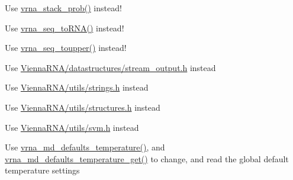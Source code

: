 \begin{DoxyRefList}
\item[\label{deprecated__deprecated000103}%
\Hypertarget{deprecated__deprecated000103}%
Global \hyperlink{group__part__func__global__deprecated_ga8f18624bcd0b47d1a266d9e5527e5362}{stack\+Prob} (double cutoff)]Use \hyperlink{group__part__func__global_ga132664bf29fdc30bb5ea715491d1ab22}{vrna\+\_\+stack\+\_\+prob()} instead! 
\item[\label{deprecated__deprecated000178}%
\Hypertarget{deprecated__deprecated000178}%
Global \hyperlink{strings_8h_ad3f18dd83f958f18b2f26ecb99305208}{str\+\_\+\+D\+N\+A2\+R\+NA} (char $\ast$sequence)]Use \hyperlink{group__string__utils_gacfed92cba77064f6c743f9118d079bfc}{vrna\+\_\+seq\+\_\+to\+R\+N\+A()} instead!  
\item[\label{deprecated__deprecated000177}%
\Hypertarget{deprecated__deprecated000177}%
Global \hyperlink{strings_8h_a17b796b806f96b70382077fb5bc519bb}{str\+\_\+uppercase} (char $\ast$sequence)]Use \hyperlink{group__string__utils_ga4f44dca03c9d708d68e64c0610bb9091}{vrna\+\_\+seq\+\_\+toupper()} instead!  
\item[\label{deprecated__deprecated000129}%
\Hypertarget{deprecated__deprecated000129}%
File \hyperlink{stream__output_8h}{stream\+\_\+output.h} ]Use \hyperlink{datastructures_2stream__output_8h}{Vienna\+R\+N\+A/datastructures/stream\+\_\+output.\+h} instead  
\item[\label{deprecated__deprecated000130}%
\Hypertarget{deprecated__deprecated000130}%
File \hyperlink{string__utils_8h}{string\+\_\+utils.h} ]Use \hyperlink{strings_8h}{Vienna\+R\+N\+A/utils/strings.\+h} instead  
\item[\label{deprecated__deprecated000131}%
\Hypertarget{deprecated__deprecated000131}%
File \hyperlink{structure__utils_8h}{structure\+\_\+utils.h} ]Use \hyperlink{utils_2structures_8h}{Vienna\+R\+N\+A/utils/structures.\+h} instead  
\item[\label{deprecated__deprecated000135}%
\Hypertarget{deprecated__deprecated000135}%
File \hyperlink{svm__utils_8h}{svm\+\_\+utils.h} ]Use \hyperlink{svm_8h_source}{Vienna\+R\+N\+A/utils/svm.\+h} instead  
\item[\label{deprecated__deprecated000089}%
\Hypertarget{deprecated__deprecated000089}%
Global \hyperlink{group__model__details_gab4b11c8d9c758430960896bc3fe82ead}{temperature} ]Use \hyperlink{group__model__details_gaf9e527e9a2f7e6fd6e42bc6e602f5445}{vrna\+\_\+md\+\_\+defaults\+\_\+temperature()}, and \hyperlink{group__model__details_ga96b24a74437f9ba46c4e06343155bf46}{vrna\+\_\+md\+\_\+defaults\+\_\+temperature\+\_\+get()} to change, and read the global default temperature settings  

\end{DoxyRefList}

